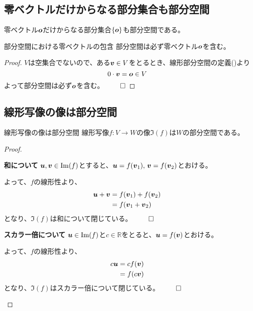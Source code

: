 \documentclass[../../../topic_linear-algebra]{subfiles}
\begin{document}
\subsection{零ベクトルだけからなる部分集合も部分空間}

零ベクトル$\vb*{o}$だけからなる部分集合$\{ \vb*{o} \}$も部分空間である。

\begin{theorem}{部分空間における零ベクトルの包含}\label{thm:subspace-contains-zero}
  部分空間は必ず零ベクトル$\vb*{o}$を含む。
\end{theorem}

\begin{proof}
  $V$は空集合でないので、ある$\vb*{v} \in V$をとるとき、線形部分空間の定義()より
  \begin{equation*}
    0 \cdot \vb*{v} = \vb*{o} \in V
  \end{equation*}
  よって部分空間は必ず$\vb*{o}$を含む。 $\qed$
\end{proof}

\subsection{線形写像の像は部分空間}

\begin{theorem}{線形写像の像は部分空間}
  線形写像$f\colon V \to W$の像$\Im(f)$は$W$の部分空間である。
\end{theorem}

\begin{proof}
  \begin{subpattern}{\bfseries 和について}
    $\vb*{u}, \vb*{v} \in \Im(f)$とすると、$\vb*{u} = f(\vb*{v}_1),\, \vb*{v} = f(\vb*{v}_2)$とおける。

    よって、$f$の線形性より、
    \begin{align*}
      \vb*{u} + \vb*{v} & = f(\vb*{v}_1) + f(\vb*{v}_2) \\
                        & = f(\vb*{v}_1 + \vb*{v}_2)
    \end{align*}
    となり、$\Im(f)$は和について閉じている。 $\qed$
  \end{subpattern}

  \begin{subpattern}{\bfseries スカラー倍について}
    $\vb*{u} \in \Im(f)$と$c \in \mathbb{R}$をとると、$\vb*{u} = f(\vb*{v})$とおける。

    よって、$f$の線形性より、
    \begin{align*}
      c \vb*{u} & = c f(\vb*{v}) \\
                & = f(c \vb*{v})
    \end{align*}
    となり、$\Im(f)$はスカラー倍について閉じている。 $\qed$
  \end{subpattern}
\end{proof}
\end{document}

